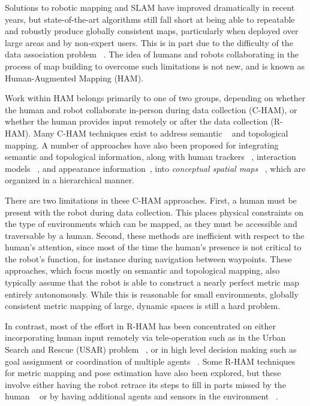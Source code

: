 \documentclass[letterpaper]{article} %
\theoremstyle{definition}
\begin{document}
Solutions to robotic mapping and SLAM have improved dramatically in recent
years, but state-of-the-art algorithms still fall short at being able to
repeatable and robustly produce globally consistent maps,
particularly when deployed over large areas and by non-expert users. This is in
part due to the difficulty of the data association problem
~\cite{dissanayake2011review,bailey2006simultaneous,aulinas2008slam}. The idea
of humans and robots collaborating in the process of map building to overcome
such limitations is not new, and is known as Human-Augmented Mapping (HAM).

Work within HAM belongs primarily to one of two groups, depending on whether
the human and robot collaborate in-person during data collection (C-HAM),
or whether the human provides input remotely or after the data collection
(R-HAM). Many C-HAM techniques exist to address semantic
~\cite{nieto2010semantic,christensen2010detecting} and topological
~\cite{topp2006topological} mapping. A number of approaches have also been
proposed for integrating semantic and topological information, along with human
trackers ~\cite{milella2007laser}, interaction models ~\cite{topp2006bringing},
and appearance information~\cite{pronobis2012large}, into \emph{conceptual
spatial maps} ~\cite{zender2007integrated}, which are organized in a
hierarchical manner.

There are two limitations in these C-HAM approaches. First, a
human must be present with the robot during data collection. This places
physical constraints on the type of environments which can be mapped, as they
must be accessible and traversable by a human. Second, these methods are
inefficient with respect to the human's attention, since most of the time the
human's presence is not critical to the robot's function, for instance during
navigation between waypoints. These approaches, which focus mostly on semantic
and topological mapping, also typically assume that the robot is able to
construct a nearly perfect metric map entirely autonomously. While this is
reasonable for small environments, globally consistent metric mapping of large,
dynamic spaces is still a hard problem.

In contrast, most of the effort in R-HAM has been concentrated on either
incorporating human input remotely via tele-operation such as in the Urban
Search and Rescue (USAR) problem ~\cite{murphy2004human,nourbakhsh2005human}, or
in high level decision making such as goal assignment or coordination of
multiple agents
~\cite{olson2013exploration,parasuraman2007adaptive,doroodgar2010search}. Some
R-HAM techniques for metric mapping and pose estimation have also been explored,
but these involve either having the robot retrace its steps to fill in parts
missed by the human ~\cite{kim2009human} or by having additional agents and
sensors in the environment ~\cite{kleiner2007mapping}.
\end{document}
